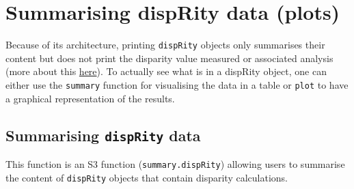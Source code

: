 \documentclass[]{book}
\begin{document}
\hypertarget{summarising-disprity-data-plots}{%
\section{Summarising dispRity data (plots)}\label{summarising-disprity-data-plots}}

Because of its architecture, printing \texttt{dispRity} objects only summarises their content but does not print the disparity value measured or associated analysis (more about this \protect\hyperlink{manipulating-dispRity-objects}{here}).
To actually see what is in a dispRity object, one can either use the \texttt{summary} function for visualising the data in a table or \texttt{plot} to have a graphical representation of the results.

\hypertarget{summarising-disprity-data}{%
\subsection{\texorpdfstring{Summarising \texttt{dispRity} data}{Summarising dispRity data}}\label{summarising-disprity-data}}

This function is an S3 function (\texttt{summary.dispRity}) allowing users to summarise the content of \texttt{dispRity} objects that contain disparity calculations.
\end{document}
